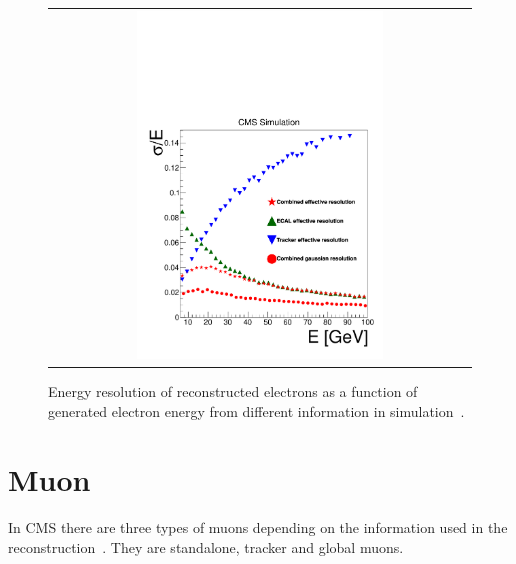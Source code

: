 \begin{figure}[htp] 
\centering 
\begin{tabular}{c} 
\includegraphics[width=0.6\textwidth]{figures/effRMSfinal-3.pdf} 
\end{tabular} 
\caption{Energy resolution of reconstructed electrons as a function 
of generated electron energy from different information 
in simulation~\cite{PAS-HIG-13-002}. 
}
\label{fig:ElectronEnergyResMC} 
\end{figure} 

\section{ Muon }
\label{sec:muon_reco}

In CMS there are three types of muons depending on the information used in the 
reconstruction~\cite{cmstdr1}. They are standalone, tracker and global muons.   

